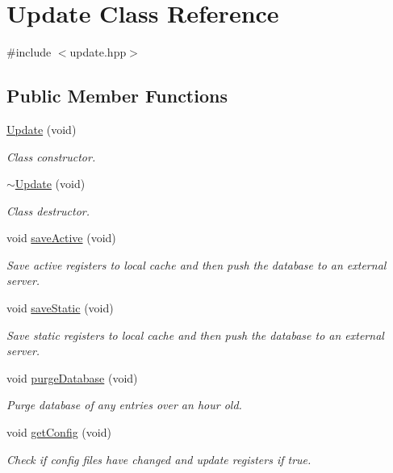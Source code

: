 \hypertarget{class_update}{}\section{Update Class Reference}
\label{class_update}


{\ttfamily \#include $<$update.\+hpp$>$}

\subsection*{Public Member Functions}
\begin{DoxyCompactItemize}
\item 
\hyperlink{class_update_a929be37ba13defe954636d08d7e5fc85}{Update} (void)
\begin{DoxyCompactList}\small\item\em Class constructor. \end{DoxyCompactList}\item 
\hyperlink{class_update_a60ebd12d7fa5522051224aafabbcd173}{$\sim$\+Update} (void)
\begin{DoxyCompactList}\small\item\em Class destructor. \end{DoxyCompactList}\item 
void \hyperlink{class_update_abe8da9ed1741071632333a18f6ab8a8e}{save\+Active} (void)
\begin{DoxyCompactList}\small\item\em Save active registers to local cache and then push the database to an external server. \end{DoxyCompactList}\item 
void \hyperlink{class_update_a2862a009b663402e8f61909ee1dbfd73}{save\+Static} (void)
\begin{DoxyCompactList}\small\item\em Save static registers to local cache and then push the database to an external server. \end{DoxyCompactList}\item 
void \hyperlink{class_update_a9303c4c10cdf05f46d023d15c3ccdf65}{purge\+Database} (void)
\begin{DoxyCompactList}\small\item\em Purge database of any entries over an hour old. \end{DoxyCompactList}\item 
void \hyperlink{class_update_acd57a3baaababf08fea4f9c1026d5ed2}{get\+Config} (void)
\begin{DoxyCompactList}\small\item\em Check if config files have changed and update registers if true. \end{DoxyCompactList}\end{DoxyCompactItemize}


